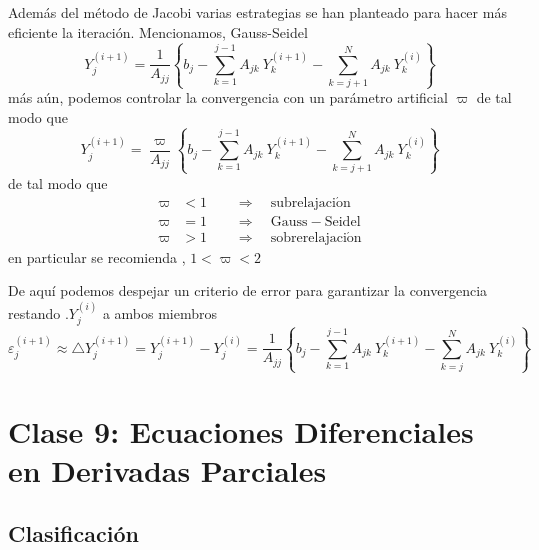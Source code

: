 \documentclass[spanish,titlepage,11pt]{article}
\begin{document}
Adem\'{a}s del m\'{e}todo de Jacobi varias estrategias se han planteado para
hacer m\'{a}s eficiente la iteraci\'{o}n. Mencionamos, Gauss-Seidel
\[
Y_{j}^{(i+1)}=\frac{1}{A_{jj}}\left\{  b_{j}-\sum_{k=1}^{j-1}A_{jk}%
\ Y_{k}^{\left(  i+1\right)  }-\sum_{k=j+1}^{N}A_{jk}\ Y_{k}^{\left(
i\right)  }\right\}
\]
m\'{a}s a\'{u}n, podemos controlar la convergencia con un par\'{a}metro
artificial $\varpi$ de tal modo que
\[
Y_{j}^{(i+1)}=\frac{\varpi}{A_{jj}}\left\{  b_{j}-\sum_{k=1}^{j-1}%
A_{jk}\ Y_{k}^{\left(  i+1\right)  }-\sum_{k=j+1}^{N}A_{jk}\ Y_{k}^{\left(
i\right)  }\right\}
\]
de tal modo que
\begin{align*}
\varpi &  <1\qquad\Rightarrow\quad\mathrm{subrelajaci\acute{o}n}\\
\varpi &  =1\qquad\Rightarrow\quad\mathrm{Gauss-Seidel}\\
\varpi &  >1\qquad\Rightarrow\quad\mathrm{sobrerelajaci\acute{o}n}%
\end{align*}
en particular se recomienda , $1<\varpi<2$

De aqu\'{i} podemos despejar un criterio de error para garantizar la
convergencia restando .$Y_{j}^{(i)}$ a ambos miembros
\[
\varepsilon_{j}^{\left(  i+1\right)  }\approx\triangle Y_{j}^{(i+1)}%
=Y_{j}^{(i+1)}-Y_{j}^{(i)}=\frac{1}{A_{jj}}\left\{  b_{j}-\sum_{k=1}%
^{j-1}A_{jk}\ Y_{k}^{\left(  i+1\right)  }-\sum_{k=j}^{N}A_{jk}\ Y_{k}%
^{\left(  i\right)  }\right\}
\]

\newpage

\section{\textbf{Clase 9: Ecuaciones Diferenciales en Derivadas Parciales}}

\subsection{Clasificaci\'{o}n}
\end{document}

